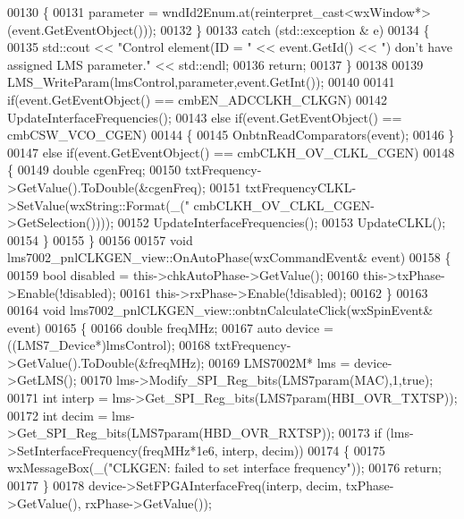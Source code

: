 \begin{DoxyCode}
{{{{{00130     \{
00131         parameter = wndId2Enum.at(reinterpret\_cast<wxWindow*>(event.GetEventObject()));
00132     \}
00133     \textcolor{keywordflow}{catch} (std::exception & e)
00134     \{
00135         std::cout << \textcolor{stringliteral}{"Control element(ID = "} << \textcolor{keyword}{event}.GetId() << \textcolor{stringliteral}{") don't have assigned LMS parameter."} << 
      std::endl;
00136         \textcolor{keywordflow}{return};
00137     \}
00138 
00139     LMS_WriteParam(lmsControl,parameter,event.GetInt());
00140 
00141     \textcolor{keywordflow}{if}(event.GetEventObject() == cmbEN_ADCCLKH_CLKGN)
00142         UpdateInterfaceFrequencies();
00143     \textcolor{keywordflow}{else} \textcolor{keywordflow}{if}(event.GetEventObject() == cmbCSW_VCO_CGEN)
00144     \{
00145         OnbtnReadComparators(event);
00146     \}
00147     \textcolor{keywordflow}{else} \textcolor{keywordflow}{if}(event.GetEventObject() == cmbCLKH_OV_CLKL_CGEN)
00148     \{
00149         \textcolor{keywordtype}{double} cgenFreq;
00150         txtFrequency->GetValue().ToDouble(&cgenFreq);
00151         txtFrequencyCLKL->SetValue(wxString::Format(\_(\textcolor{stringliteral}{"%
      cmbCLKH_OV_CLKL_CGEN->GetSelection())));
00152         UpdateInterfaceFrequencies();
00153         UpdateCLKL();
00154     \}
00155 \}
00156 
00157  \textcolor{keywordtype}{void} lms7002_pnlCLKGEN_view::OnAutoPhase(wxCommandEvent& event)
00158  \{
00159      \textcolor{keywordtype}{bool} disabled = this->chkAutoPhase->GetValue();
00160      this->txPhase->Enable(!disabled);
00161      this->rxPhase->Enable(!disabled);
00162  \}
00163 
00164 \textcolor{keywordtype}{void} lms7002_pnlCLKGEN_view::onbtnCalculateClick(wxSpinEvent& event)
00165 \{
00166     \textcolor{keywordtype}{double} freqMHz;
00167     \textcolor{keyword}{auto} device = ((LMS7_Device*)lmsControl);
00168     txtFrequency->GetValue().ToDouble(&freqMHz);
00169     LMS7002M* lms = device->GetLMS();
00170     lms->Modify_SPI_Reg_bits(LMS7param(MAC),1,\textcolor{keyword}{true});
00171     \textcolor{keywordtype}{int} interp = lms->Get_SPI_Reg_bits(LMS7param(HBI_OVR_TXTSP));
00172     \textcolor{keywordtype}{int} decim = lms->Get_SPI_Reg_bits(LMS7param(HBD_OVR_RXTSP));
00173     \textcolor{keywordflow}{if} (lms->SetInterfaceFrequency(freqMHz*1e6, interp, decim))
00174     \{
00175         wxMessageBox(\_(\textcolor{stringliteral}{"CLKGEN: failed to set interface frequency"}));
00176         \textcolor{keywordflow}{return};
00177     \}
00178     device->SetFPGAInterfaceFreq(interp, decim, txPhase->GetValue(), rxPhase->GetValue());
}}}}}}
\end{DoxyCode}
